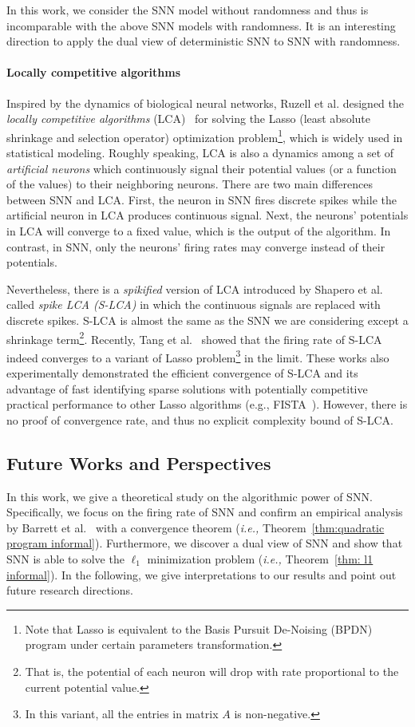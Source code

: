 \documentclass[11pt]{article}
\theoremstyle{remark}
\theoremstyle{definition}
\begin{document}
In this work, we consider the SNN model without randomness and thus is incomparable with the above SNN models with randomness. It is an interesting direction to apply the dual view of deterministic SNN to SNN with randomness.

\paragraph{Locally competitive algorithms}
Inspired by the dynamics of biological neural networks, Ruzell et al. designed the \textit{locally competitive algorithms} (LCA)~\cite{rozell2008sparse} for solving the Lasso (least absolute shrinkage and selection operator) optimization problem\footnote{Note that Lasso is equivalent to the Basis Pursuit De-Noising (BPDN) program under certain parameters transformation.}, which is widely used in statistical modeling. Roughly speaking, LCA is also a dynamics among a set of \textit{artificial neurons} which continuously signal their potential values (or a function of the values) to their neighboring neurons. There are two main differences between SNN and LCA. First, the neuron in SNN fires discrete spikes while the artificial neuron in LCA produces continuous signal. Next,  the neurons' potentials in LCA will converge to a fixed  value, which is the output of the algorithm. In contrast, in SNN, only the neurons' firing rates may converge instead of their potentials.

Nevertheless, there is a \textit{spikified} version of LCA introduced by Shapero et al.~\cite{shapero2013configurable,shapero2014optimal} called \textit{spike LCA (S-LCA)} in which the continuous signals are replaced with discrete spikes. S-LCA is almost the same as the SNN we are considering except a shrinkage term\footnote{That is, the potential of each neuron will drop with rate proportional to the current potential value.}.
Recently, Tang et al.~\cite{tang2017sparse} showed that the firing rate of S-LCA indeed converges to a variant of Lasso problem\footnote{In this variant, all the entries in matrix $A$ is non-negative.} in the limit. These works also experimentally demonstrated the efficient convergence of S-LCA and its advantage of fast identifying sparse solutions with potentially competitive practical performance to other Lasso algorithms (e.g., FISTA~\cite{beck2009fast}). However, there is no proof of convergence rate, and thus no explicit complexity bound of S-LCA.

\subsection{Future Works and Perspectives}\label{sec:future}
In this work, we give a theoretical study on the algorithmic power of SNN. Specifically, we focus on the firing rate of SNN and confirm an empirical analysis by Barrett et al.~\cite{barrett2013firing} with a convergence theorem (\textit{i.e.,} Theorem~\ref{thm:quadratic program informal}). Furthermore, we discover a dual view of SNN and show that SNN is able to solve the $\ell_1$ minimization problem (\textit{i.e.,} Theorem~\ref{thm: l1 informal}). In the following, we give interpretations to our results and point out future research directions.
\end{document}
